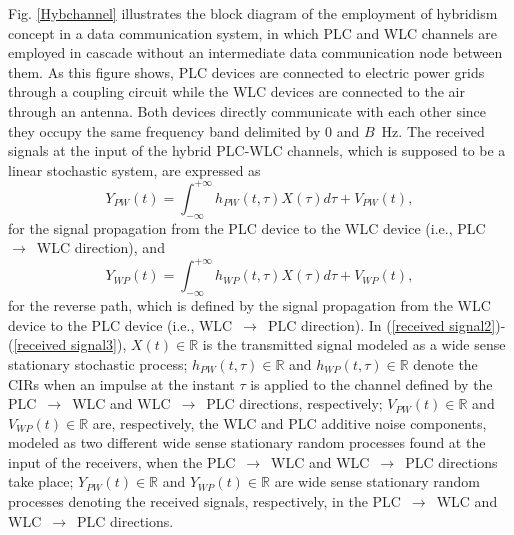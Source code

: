 \documentclass[journal]{IEEEtran}
\begin{document}
Fig. \ref{Hybchannel} illustrates the block diagram of the employment of hybridism concept in a data communication system, in which \ac{PLC} and \ac{WLC} channels are employed in cascade without an intermediate data communication node between them. As this figure shows, \ac{PLC} devices are connected to electric power grids through a coupling circuit while the \ac{WLC} devices are connected to the air through an antenna. Both devices directly communicate with each other since they occupy the same frequency band delimited by $0$ and $B$~Hz. The received signals at the input of the hybrid \ac{PLC}-\ac{WLC} channels, which is supposed to be a linear stochastic system, are expressed as
\begin{equation} \label{received signal2}
Y_{PW}(t) = \int_{-\infty}^{+\infty} h_{PW}(t,\tau) X(\tau) d\tau + V_{PW}(t),
\end{equation}
for the signal propagation from the \ac{PLC} device to the \ac{WLC} device (i.e., \ac{PLC}~$\rightarrow$~\ac{WLC} direction), and
\begin{equation} \label{received signal3}
Y_{WP}(t) = \int_{-\infty}^{+\infty} h_{WP}(t,\tau) X(\tau) d\tau + V_{WP}(t),
\end{equation}
for the reverse path, which is defined by the signal propagation from the \ac{WLC} device to the \ac{PLC} device (i.e., \ac{WLC}~$\rightarrow$~\ac{PLC} direction). In (\ref{received signal2})-(\ref{received signal3}),  $X(t)\in \mathbb{R}$ is the transmitted signal modeled as a wide sense stationary stochastic process; $h_{PW}(t,\tau)\in \mathbb{R}$ and $h_{WP}(t,\tau)\in \mathbb{R}$ denote the \acp{CIR} when an impulse at the instant $\tau$ is applied to the channel defined by the \ac{PLC}~$\rightarrow$~\ac{WLC} and \ac{WLC}~$\rightarrow$~\ac{PLC} directions, respectively; $V_{PW}(t)\in \mathbb{R}$ and $V_{WP}(t)\in \mathbb{R}$ are, respectively, the \ac{WLC} and \ac{PLC} additive noise components, modeled as two different wide sense stationary random processes found at the input of the receivers, when the \ac{PLC}~$\rightarrow$~\ac{WLC} and \ac{WLC}~$\rightarrow$~\ac{PLC} directions take place; $Y_{PW}(t)\in \mathbb{R}$ and ${Y}_{WP}(t)\in \mathbb{R}$ are wide sense stationary random processes denoting the received signals, respectively, in the \ac{PLC}~$\rightarrow$~\ac{WLC} and \ac{WLC}~$\rightarrow$~\ac{PLC} directions.
\end{document}
